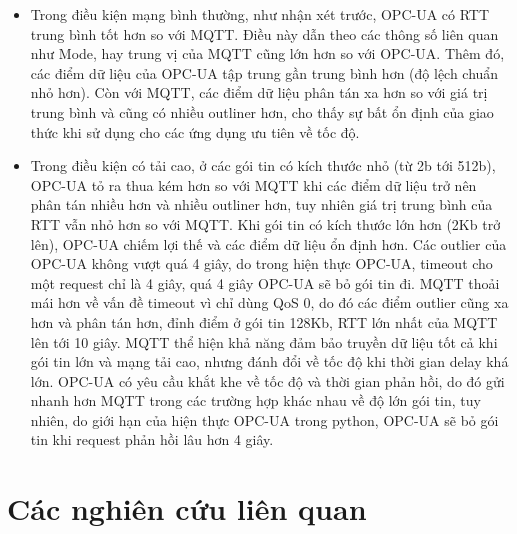 \begin{itemize}
    \item Trong điều kiện mạng bình thường, như nhận xét trước, OPC-UA có RTT trung bình tốt hơn so với MQTT. Điều này dẫn theo các thông số liên quan như Mode, hay trung vị của MQTT cũng lớn hơn so với OPC-UA. Thêm đó, các điểm dữ liệu của OPC-UA tập trung gần trung bình hơn (độ lệch chuẩn nhỏ hơn). Còn với MQTT, các điểm dữ liệu phân tán xa hơn so với giá trị trung bình và cũng có nhiều outliner hơn, cho thấy sự bất ổn định của giao thức khi sử dụng cho các ứng dụng ưu tiên về tốc độ.
    \item Trong điều kiện có tải cao, ở các gói tin có kích thước nhỏ (từ 2b tới 512b), OPC-UA tỏ ra thua kém hơn so với MQTT khi các điểm dữ liệu trở nên phân tán nhiều hơn và nhiều outliner hơn, tuy nhiên giá trị trung bình của RTT vẫn nhỏ hơn so với MQTT. Khi gói tin có kích thước lớn hơn (2Kb trở lên), OPC-UA chiếm lợi thế và các điểm dữ liệu ổn định hơn. Các outlier của OPC-UA không vượt quá 4 giây, do trong hiện thực OPC-UA, timeout cho một request chỉ là 4 giây, quá 4 giây OPC-UA sẽ bỏ gói tin đi. MQTT thoải mái hơn về vấn đề timeout vì chỉ dùng QoS 0, do đó các điểm outlier cũng xa hơn và phân tán hơn, đỉnh điểm ở gói tin 128Kb, RTT lớn nhất của MQTT lên tới 10 giây. MQTT thể hiện khả năng đảm bảo truyền dữ liệu tốt cả khi gói tin lớn và mạng tải cao, nhưng đánh đổi về tốc độ khi thời gian delay khá lớn. OPC-UA có yêu cầu khắt khe về tốc độ và thời gian phản hồi, do đó gửi nhanh hơn MQTT trong các trường hợp khác nhau về độ lớn gói tin, tuy nhiên, do giới hạn của hiện thực OPC-UA trong python, OPC-UA sẽ bỏ gói tin khi request phản hồi lâu hơn 4 giây. 
\end{itemize}


\section{Các nghiên cứu liên quan}

